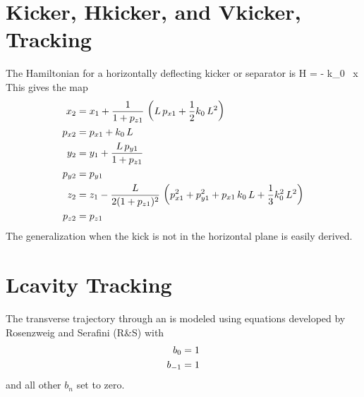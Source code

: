 \section{Kicker, Hkicker, and Vkicker, Tracking}
\label{s:kicker.std}

The Hamiltonian for a horizontally deflecting kicker or separator is
\Begineq
  H =  - k_0 \, x 
\Endeq
This gives the map
\begin{align}
  x_2    &= x_1 + \frac{1}{1 + p_{z1}} \, \left( L \, p_{x1} + \frac{1}{2} k_0 \, L^2 \right) \nonumber \\
  p_{x2} &= p_{x1} + k_0 \, L \nonumber \\
  y_2    &= y_1 + \frac{L \, p_{y1}}{1 + p_{z1}} \nonumber \\
  p_{y2} &= p_{y1}  \\
  z_2    &= z_1 - \frac{L}{2 (1 + p_{z1})^2} \, 
    \left( p_{x1}^2 + p_{y1}^2 + p_{x1} \, k_0 \, L + \frac{1}{3} k_0^2 \, L^2 \right) \nonumber \\
  p_{z2} &= p_{z1} \nonumber
\end{align}
The generalization when the kick is not in the horizontal plane is easily derived.

\section{Lcavity Tracking}
\label{s:lcavity.std}

The transverse trajectory through an  is modeled using equations
developed by Rosenzweig and Serafini\cite{b:rosenzweig} (R\&S) with
\begin{align}
  b_0 &= 1 \nonumber \\
  b_{-1} &= 1 
\end{align}
and all other $b_n$ set to zero.

